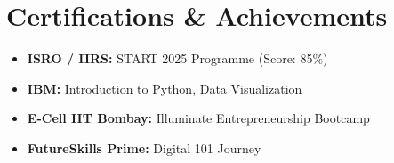 \documentclass[10pt,letterpaper]{article}
\begin{document}
\section*{Certifications \& Achievements}
\begin{itemize}[noitemsep, topsep=0pt, leftmargin=1.5em]
    \item \textbf{ISRO / IIRS:} START 2025 Programme (Score: 85\%)
    \item \textbf{IBM:} Introduction to Python, Data Visualization
    \item \textbf{E-Cell IIT Bombay:} Illuminate Entrepreneurship Bootcamp
    \item \textbf{FutureSkills Prime:} Digital 101 Journey
\end{itemize}
\end{document}
